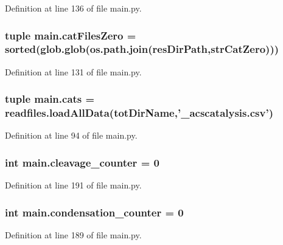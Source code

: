 Definition at line 136 of file main.\-py.

\hypertarget{a00151_a7ab6089d577bd60acf22b92e84930523}{
\subsubsection[{cat\-Files\-Zero}]{\setlength{\rightskip}{0pt plus 5cm}tuple main.\-cat\-Files\-Zero = sorted(glob.\-glob(os.\-path.\-join({\bf res\-Dir\-Path},{\bf str\-Cat\-Zero})))}}\label{a00151_a7ab6089d577bd60acf22b92e84930523}


Definition at line 131 of file main.\-py.

\hypertarget{a00151_adc0282a6415a88834556e66807bcc800}{
\subsubsection[{cats}]{\setlength{\rightskip}{0pt plus 5cm}tuple main.\-cats = readfiles.\-load\-All\-Data({\bf tot\-Dir\-Name},'\-\_\-acscatalysis.\-csv')}}\label{a00151_adc0282a6415a88834556e66807bcc800}


Definition at line 94 of file main.\-py.

\hypertarget{a00151_aba28788973ae3e9140b53078efe5d204}{
\subsubsection[{cleavage\-\_\-counter}]{\setlength{\rightskip}{0pt plus 5cm}int main.\-cleavage\-\_\-counter = 0}}\label{a00151_aba28788973ae3e9140b53078efe5d204}


Definition at line 191 of file main.\-py.

\hypertarget{a00151_a358b60986e7e25df0dfb61562b7aa3e2}{
\subsubsection[{condensation\-\_\-counter}]{\setlength{\rightskip}{0pt plus 5cm}int main.\-condensation\-\_\-counter = 0}}\label{a00151_a358b60986e7e25df0dfb61562b7aa3e2}


Definition at line 189 of file main.\-py.

